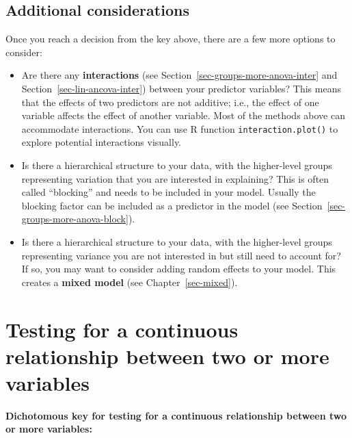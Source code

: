 \documentclass[
  13,
  letterpaper,
]{report}
\providecommand{\tightlist}{%
  \setlength{\itemsep}{0pt}\setlength{\parskip}{0pt}}
\begin{document}
\subsection{Additional considerations}\label{sec-plan-meanloc-addl}

Once you reach a decision from the key above, there are a few more
options to consider:

\begin{itemize}
\tightlist
\item
  Are there any \textbf{interactions} (see
  Section~\ref{sec-groups-more-anova-inter} and
  Section~\ref{sec-lin-ancova-inter}) between your predictor variables?
  This means that the effects of two predictors are not additive; i.e.,
  the effect of one variable affects the effect of another variable.
  Most of the methods above can accommodate interactions. You can use R
  function \texttt{interaction.plot()} to explore potential interactions
  visually.
\item
  Is there a hierarchical structure to your data, with the higher-level
  groups representing variation that you are interested in explaining?
  This is often called ``blocking'' and needs to be included in your
  model. Usually the blocking factor can be included as a predictor in
  the model (see Section~\ref{sec-groups-more-anova-block}).
\item
  Is there a hierarchical structure to your data, with the higher-level
  groups representing variance you are not interested in but still need
  to account for? If so, you may want to consider adding random effects
  to your model. This creates a \textbf{mixed model} (see
  Chapter~\ref{sec-mixed}).
\end{itemize}

\section{Testing for a continuous relationship between two or more
variables}\label{sec-plan-cont}

\textbf{Dichotomous key for testing for a continuous relationship
between two or more variables:}
\end{document}
